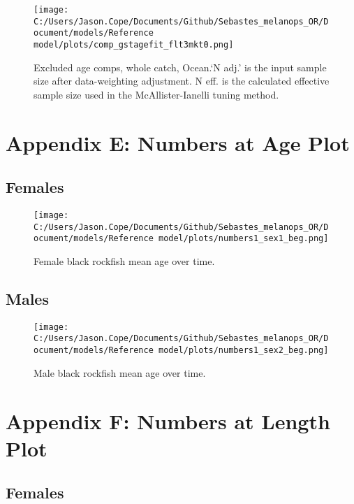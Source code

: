 \documentclass[11pt,
  english,
  letterpaper,
]{article}
\begin{document}
\begin{figure}
\centering
\texttt{[image: C:/Users/Jason.Cope/Documents/Github/Sebastes\_melanops\_OR/Document/models/Reference model/plots/comp\_gstagefit\_flt3mkt0.png]}
\caption{Excluded age comps, whole catch, Ocean.`N adj.' is the input sample size after data-weighting adjustment. N eff. is the calculated effective sample size used in the McAllister-Ianelli tuning method.\label{fig:comp_gstagefit_flt3mkt0}}
\end{figure}

\clearpage

\hypertarget{app-e}{%
\section{Appendix E: Numbers at Age Plot}\label{app-e}}

\hypertarget{females}{%
\subsection{Females}\label{females}}

\begin{figure}
\centering
\texttt{[image: C:/Users/Jason.Cope/Documents/Github/Sebastes\_melanops\_OR/Document/models/Reference model/plots/numbers1\_sex1\_beg.png]}
\caption{Female black rockfish mean age over time.\label{fig:num_age_females}}
\end{figure}

\hypertarget{males}{%
\subsection{Males}\label{males}}

\begin{figure}
\centering
\texttt{[image: C:/Users/Jason.Cope/Documents/Github/Sebastes\_melanops\_OR/Document/models/Reference model/plots/numbers1\_sex2\_beg.png]}
\caption{Male black rockfish mean age over time.\label{fig:num_age_males}}
\end{figure}

\clearpage

\hypertarget{app-f}{%
\section{Appendix F: Numbers at Length Plot}\label{app-f}}

\hypertarget{females-1}{%
\subsection{Females}\label{females-1}}
\end{document}
